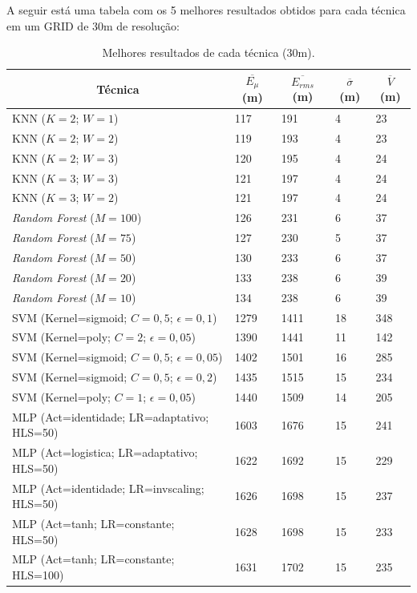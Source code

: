 \documentclass[12pt]{article}
\begin{document}
        A seguir está uma tabela com os 5 melhores resultados obtidos para cada técnica em um GRID de 30m de resolução:
        
        \begin{center}
        \begin{longtable}{|l|l|l|l|l|}
        \caption{Melhores resultados de cada técnica (30m).} 
        \label{table:resultsTop530m} \\
        \hline \multicolumn{1}{|c|}{\textbf{Técnica}} & \multicolumn{1}{c|}{\textbf{$\overline{E_{\mu}}$ (m)}} & \multicolumn{1}{c|}{\textbf{$\overline{E_{rms}}$ (m)}} & \multicolumn{1}{c|}{\textbf{$\overline{\sigma}$ (m)}} & \multicolumn{1}{c|}{\textbf{$\overline{V}$ (m)}} \\ \hline 
        \endfirsthead
        \hline
        \endlastfoot
        KNN ($K=2$; $W=1$) & 117 & 191 & 4 & 23 \\
        KNN ($K=2$; $W=2$) & 119 & 193 & 4 & 23 \\
        KNN ($K=2$; $W=3$) & 120 & 195 & 4 & 24 \\
        KNN ($K=3$; $W=3$) & 121 & 197 & 4 & 24 \\
        KNN ($K=3$; $W=2$) & 121 & 197 & 4 & 24 \\
        \hline
        \textit{Random Forest} ($M=100$) & 126 & 231 & 6 & 37 \\
        \textit{Random Forest} ($M=75$) & 127 & 230 & 5 & 37 \\
        \textit{Random Forest} ($M=50$) & 130 & 233 & 6 & 37 \\
        \textit{Random Forest} ($M=20$) & 133 & 238 & 6 & 39 \\
        \textit{Random Forest} ($M=10$) & 134 & 238 & 6 & 39 \\
        \hline
        SVM (Kernel=sigmoid; $C=0,5$; $\epsilon=0,1$) & 1279 & 1411 & 18 & 348 \\
        SVM (Kernel=poly; $C=2$; $\epsilon=0,05$) & 1390 & 1441 & 11 & 142 \\
        SVM (Kernel=sigmoid; $C=0,5$; $\epsilon=0,05$) & 1402 & 1501 & 16 & 285 \\
        SVM (Kernel=sigmoid; $C=0,5$; $\epsilon=0,2$) & 1435 & 1515 & 15 & 234 \\
        SVM (Kernel=poly; $C=1$; $\epsilon=0,05$) & 1440 & 1509 & 14 & 205 \\
        \hline
        MLP (Act=identidade; LR=adaptativo; HLS=50) & 1603 & 1676 & 15 & 241 \\
        MLP (Act=logistica; LR=adaptativo; HLS=50) & 1622 & 1692 & 15 & 229 \\
        MLP (Act=identidade; LR=invscaling; HLS=50) & 1626 & 1698 & 15 & 237 \\
        MLP (Act=tanh; LR=constante; HLS=50) & 1628 & 1698 & 15 & 233 \\
        MLP (Act=tanh; LR=constante; HLS=100) & 1631 & 1702 & 15 & 235 \\
        \end{longtable}
        \end{center}
        
\end{document}
